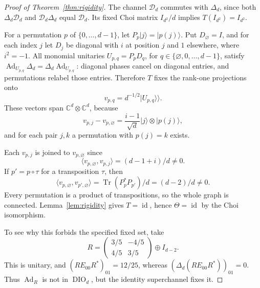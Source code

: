\documentclass[11pt]{article}
\newcommand{\DIO}{\operatorname{DIO}}
\newcommand{\Ad}{\operatorname{Ad}}
\newcommand{\Tr}{\operatorname{Tr}}
\newcommand{\id}{\operatorname{id}}
\begin{document}
\begin{proof}[Proof of Theorem~\ref{thm:rigidity}]
The channel $\mathcal D_d$ commutes with $\Delta_d$, since both
$\Delta_d\mathcal D_d$ and $\mathcal D_d\Delta_d$ equal $\mathcal D_d$.
Its fixed Choi matrix $I_{d^2}/d$ implies $T(I_{d^2})=I_{d^2}$.

For a permutation $p$ of $\{0,\ldots,d-1\}$, let $P_p|j\rangle=|p(j)\rangle$.
Put $D_\varnothing=I$, and for each index $j$ let $D_j$ be diagonal with
$i$ at position $j$ and $1$ elsewhere, where $i^2=-1$.
All monomial unitaries $U_{p,q}=P_pD_q$, for
$q\in\{\varnothing,0,\ldots,d-1\}$, satisfy
$\Ad_{U_{p,q}}\Delta_d=\Delta_d\Ad_{U_{p,q}}$:
diagonal phases cancel on diagonal entries, and permutations relabel those
entries. Therefore $T$ fixes the rank-one projections onto
\[
 v_{p,q}=d^{-1/2}|U_{p,q}\rangle\!\rangle.
\]
These vectors span $\mathbb C^d\otimes\mathbb C^d$, because
\[
 v_{p,j}-v_{p,\varnothing}
   =\frac{i-1}{\sqrt d}|j\rangle\otimes|p(j)\rangle,
\]
and for each pair $j,k$ a permutation with $p(j)=k$ exists.

Each $v_{p,j}$ is joined to $v_{p,\varnothing}$ since
\[
 \langle v_{p,\varnothing},v_{p,j}\rangle=(d-1+i)/d\ne0.
\]
If $p'=p\circ\tau$ for a transposition $\tau$, then
\[
 \langle v_{p,\varnothing},v_{p',\varnothing}\rangle
   =\Tr(P_p^*P_{p'})/d=(d-2)/d\ne0.
\]
Every permutation is a product of transpositions, so the whole graph is
connected. Lemma~\ref{lem:rigidity} gives $T=\id$, hence $\Theta=\id$
by the Choi isomorphism.

To see why this forbids the specified fixed set, take
\[
 R=\begin{pmatrix}3/5&-4/5\\4/5&3/5\end{pmatrix}\oplus I_{d-2}.
\]
This is unitary, and $(RE_{00}R^*)_{01}=12/25$, whereas
$(\Delta_d(RE_{00}R^*))_{01}=0$. Thus $\Ad_R$ is not in $\DIO_d$,
but the identity superchannel fixes it.
\end{proof}
\end{document}
